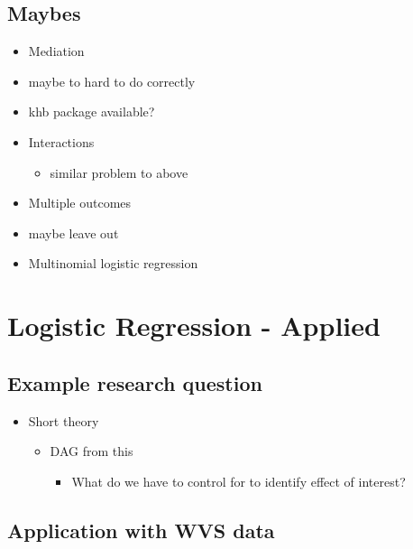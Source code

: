 \documentclass[
]{book}
\providecommand{\tightlist}{%
  \setlength{\itemsep}{0pt}\setlength{\parskip}{0pt}}
\begin{document}
\hypertarget{maybes-2}{%
\section{Maybes}\label{maybes-2}}

\begin{itemize}
\tightlist
\item
  Mediation
\item
  maybe to hard to do correctly
\item
  khb package available?
\item
  Interactions

  \begin{itemize}
  \tightlist
  \item
    similar problem to above
  \end{itemize}
\item
  Multiple outcomes
\item
  maybe leave out
\item
  Multinomial logistic regression
\end{itemize}

\hypertarget{log-a}{%
\chapter{Logistic Regression - Applied}\label{log-a}}

\hypertarget{example-research-question-1}{%
\section{Example research question}\label{example-research-question-1}}

\begin{itemize}
\tightlist
\item
  Short theory

  \begin{itemize}
  \tightlist
  \item
    DAG from this

    \begin{itemize}
    \tightlist
    \item
      What do we have to control for to identify effect of interest?
    \end{itemize}
  \end{itemize}
\end{itemize}

\hypertarget{application-with-wvs-data-1}{%
\section{Application with WVS data}\label{application-with-wvs-data-1}}
\end{document}
